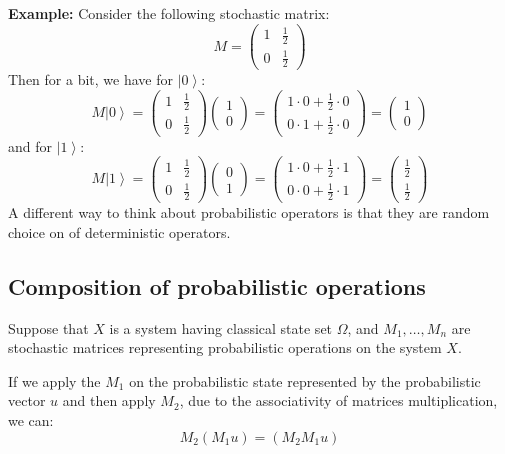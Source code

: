 \documentclass[12pt]{article} %
\newcommand{\ket}[1]{\left|#1\right\rangle}
\begin{document}
\textbf{Example:} Consider the following stochastic matrix:
$$
M = \begin{pmatrix} 1 & \frac{1}{2} \\ 0 & \frac{1}{2} \end{pmatrix}
$$
Then for a bit, we have for $\ket{0}$:
$$
M\ket{0} = \begin{pmatrix} 1 & \frac{1}{2} \\ 0 & \frac{1}{2} \end{pmatrix} \begin{pmatrix} 1 \\ 0 \end{pmatrix} = \begin{pmatrix} 1\cdot0 + \frac{1}{2}\cdot0 \\ 0\cdot1 + \frac{1}{2}\cdot0 \end{pmatrix} = \begin{pmatrix} 1 \\ 0 \end{pmatrix}
$$
and for $\ket{1}$:
$$
M\ket{1} = \begin{pmatrix} 1 & \frac{1}{2} \\ 0 & \frac{1}{2} \end{pmatrix} \begin{pmatrix} 0 \\ 1 \end{pmatrix} = \begin{pmatrix} 1\cdot0 + \frac{1}{2}\cdot1 \\ 0\cdot0 + \frac{1}{2}\cdot1 \end{pmatrix} = \begin{pmatrix} \frac{1}{2} \\ \frac{1}{2} \end{pmatrix}
$$
A different way to think about probabilistic operators is that they are random choice on of deterministic operators.
\subsection{Composition of probabilistic operations}
Suppose that $X$ is a system having classical state set $\Omega$, and $M_1, \dots, M_n $ are stochastic matrices representing probabilistic operations on the system $X$.

If we apply the $M_1$ on the probabilistic state represented by the probabilistic vector $u$ and then apply $M_2$, due to the associativity of matrices multiplication, we can:
$$
M_2(M_1u) = (M_2M_1u)
$$
\end{document}
